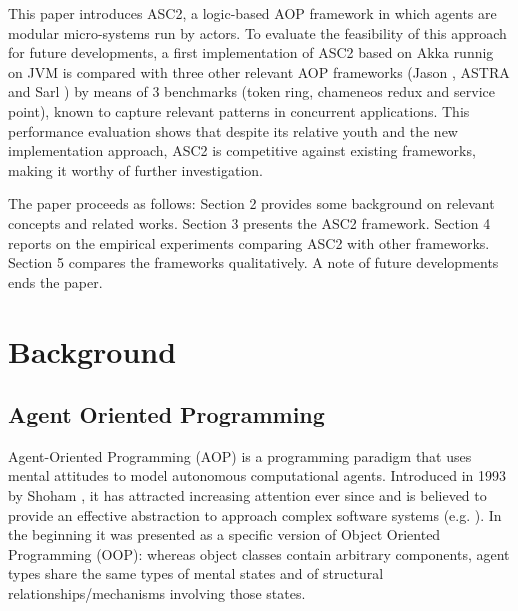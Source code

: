 This paper introduces ASC2, a logic-based AOP framework in which agents are modular micro-systems run by actors. To evaluate the feasibility of this approach for future developments, a first implementation of ASC2 based on Akka runnig on JVM is compared with three other relevant AOP frameworks (Jason \cite{Bordini2005}, ASTRA \cite{Astra} and Sarl \cite{Astra}) by means of 3 benchmarks (token ring, chameneos redux and service point), known to capture relevant patterns in concurrent applications. This performance evaluation shows that despite its relative youth and the new implementation approach, ASC2 is competitive against existing frameworks, making it worthy of further investigation.

The paper proceeds as follows: Section 2 provides some background on relevant concepts and related works. Section 3 presents the ASC2 framework. Section 4 reports on the empirical experiments comparing ASC2 with other frameworks. Section 5 compares the frameworks qualitatively. A note of future developments ends the paper.


\section{Background}
\subsection{Agent Oriented Programming}

Agent-Oriented Programming (AOP) is a programming paradigm that uses mental attitudes to model autonomous computational agents. Introduced in 1993 by Shoham \cite{shoham1993agent}, it has attracted increasing attention ever since and is believed to provide an effective abstraction to approach complex software systems (e.g. \cite{Sarl}). In the beginning it was presented as a specific version of Object Oriented Programming (OOP): whereas object classes contain arbitrary components, agent types share the same types of mental states and of structural relationships/mechanisms involving those states. 

\vspace{-5pt}
